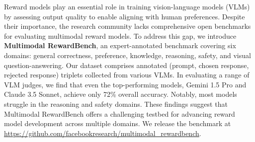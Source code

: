 
Reward models play an essential role in training vision-language models (VLMs) by assessing output quality to enable aligning with human preferences. Despite their importance, the research community lacks comprehensive open benchmarks for evaluating multimodal reward models. To address this gap, we introduce \textbf{Multimodal RewardBench}, an expert-annotated benchmark covering six domains: general correctness, preference, knowledge, reasoning, safety, and visual question-answering. Our dataset comprises \totalsamples annotated (prompt, chosen response, rejected response) triplets collected from various VLMs. In evaluating a range of VLM judges, we find that even the top-performing models, Gemini 1.5 Pro and Claude 3.5 Sonnet, achieve only 72\% overall accuracy. Notably, most models struggle in the reasoning and safety domains. These findings suggest that Multimodal RewardBench offers a challenging testbed for advancing reward model development across multiple domains.
We release the benchmark at \url{https://github.com/facebookresearch/multimodal_rewardbench}.
